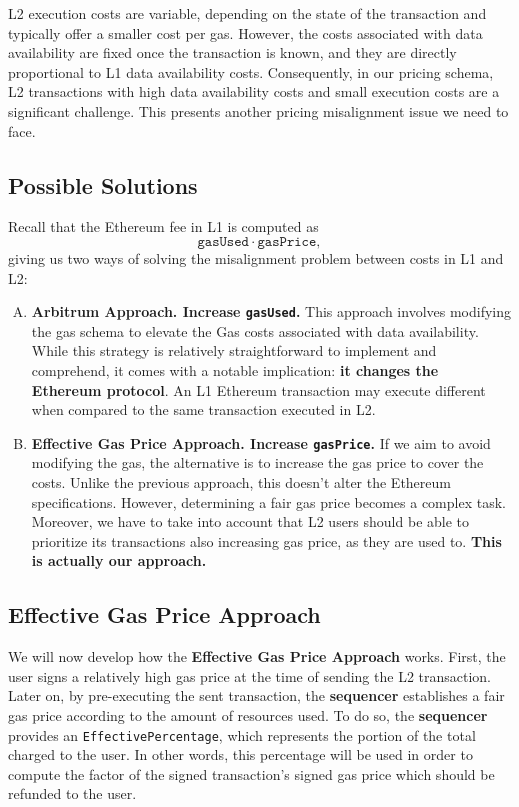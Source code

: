 L2 execution costs are variable, depending on the state of the transaction and typically offer a smaller cost per gas. However, the costs associated with data availability are fixed once the transaction is known, and they are directly proportional to L1 data availability costs. Consequently, in our pricing schema, L2 transactions with high data availability costs and small execution costs are a significant challenge. This presents another pricing misalignment issue we need to face.

\subsection{Possible Solutions}

Recall that the Ethereum fee in L1 is computed as
\[
\texttt{gasUsed} \cdot \texttt{gasPrice},
\]
giving us two ways of solving the misalignment problem between costs in L1 and L2:

\begin{enumerate}[(A)]
\item \textbf{Arbitrum Approach. Increase \texttt{gasUsed}. }
This approach involves modifying the gas schema to elevate the Gas costs associated with data availability. While this strategy is relatively straightforward to implement and comprehend, it comes with a notable implication: \textbf{it changes the Ethereum protocol}. An L1 Ethereum transaction may execute different when compared to the same transaction executed in L2.

\item \textbf{Effective Gas Price Approach. Increase \texttt{gasPrice}. }
If we aim to avoid modifying the gas, the alternative is to increase the gas price to cover the costs. Unlike the previous approach, this doesn't alter the Ethereum specifications. However, determining a fair gas price becomes a complex task. Moreover, we have to take into account that L2 users should be able to prioritize its transactions also increasing gas price, as they are used to. \textbf{This is actually our approach.}
\end{enumerate}


\subsection{Effective Gas Price Approach}

We will now develop how the \textbf{Effective Gas Price Approach} works. First, the user signs a relatively high gas price at the time of sending the L2 transaction. Later on, by pre-executing the sent transaction, the \textbf{sequencer} establishes a fair gas price according to the amount of resources used. To do so, the \textbf{sequencer} provides an \texttt{EffectivePercentage}, which represents the portion of the total charged to the user. In other words, this percentage will be used in order to compute the factor of the signed transaction's signed gas price which should be refunded to the user.

